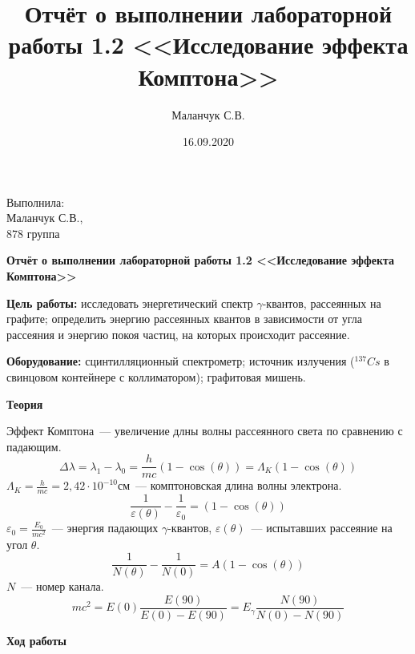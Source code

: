 \documentclass[12pt]{article}
\title{Отчёт о выполнении лабораторной работы 1.2 <<Исследование эффекта Комптона>>}
\author{Маланчук С.В.}
\date{16.09.2020}
\begin{document}
\begin{flushright}
    Выполнила:
    \\
    Маланчук С.В.,
    \\
    878 группа
\end{flushright}

\begin{center}
    \begin{Large}
        \textbf{Отчёт о выполнении лабораторной работы 1.2 <<Исследование эффекта Комптона>>}
    \end{Large}
\end{center}


\parindent=1cm \textbf{Цель работы:} исследовать энергетический спектр
$\gamma$-квантов, рассеянных на графите; определить энергию рассеянных квантов в
зависимости от угла рассеяния и энергию покоя частиц, на которых происходит рассеяние.

\parindent=1cm \textbf{Оборудование:} сцинтилляционный спектрометр; источник
излучения ($^{137}Cs$ в свинцовом контейнере с коллиматором); графитовая мишень.

\begin{center}
    \textbf{Теория}
\end{center}

Эффект Комптона~--- увеличение длны волны рассеянного света по сравнению с падающим.
\begin{equation}
    \label{eq:(1)}
    \Delta \lambda = \lambda_1 - \lambda_0 = \frac{h}{mc}(1 - \cos(\theta)) = \Lambda_K(1 - \cos(\theta))
\end{equation}
$\Lambda_K = \frac{h}{mc} = 2,42 \cdot 10^{-10} \text{см}$~--- комптоновская
длина волны электрона.
\begin{equation}
    \label{eq:(2)}
    \frac{1}{\varepsilon(\theta)} - \frac{1}{\varepsilon_0} = (1 - \cos(\theta))
\end{equation}
$\varepsilon_0 = \frac{E_0}{mc^2}$~--- энергия падающих $\gamma$-квантов,
$\varepsilon(\theta)$~--- испытавших рассеяние на угол $\theta$.
\begin{equation}
    \label{eq:(3)}
    \frac{1}{N(\theta)} - \frac{1}{N(0)} = A(1 - \cos(\theta))
\end{equation}
$N$~--- номер канала.
\begin{equation}
    \label{eq:(4)}
    mc^2 = E(0)\frac{E(90)}{E(0) - E(90)} = E_{\gamma} \frac{N(90)}{N(0) - N(90)}
\end{equation}
\newpage
\begin{center}
    \textbf{Ход работы}
\end{center}
\end{document}

